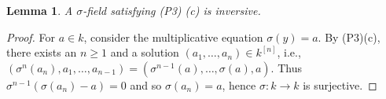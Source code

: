 \documentclass[oneside,reqno]{amsart}
\newtheorem{lemma}[theo]{Lemma}
\newtheorem{conj}[theo]{Conjecture}
\theoremstyle{definition}
\newcommand{\spec}{\operatorname{Spec}}
\newcommand{\G}{\mathcal{G}}
\newcommand{\X}{\mathcal{X}}
\newcommand{\s}{\sigma}
\newcommand{\Gm}{\mathbb{G}_m}
\newcommand{\kn}{k^{[n]}}
\newcommand{\po}{{\rm{(P1$^u$)}}}
\newcommand{\pt}{{\rm{(P3$^u$)}}}
\newcommand{\ptweak}{{\rm{(P3)}}}
\begin{document}
\begin{lemma} \label{lemma: inversive}
	A $\s$-field satisfying \ptweak{} \rm{(c)} is inversive. 
\end{lemma}
\begin{proof}
	For $a\in k$, consider the multiplicative equation $\s(y)=a$. By \ptweak{}(c), there exists an $n\geq 1$ and a solution $(a_1,\dots,a_n)\in\kn$, i.e., $(\s^n(a_n), a_1,\dots,a_{n-1})=(\s^{n-1}(a),\dots,\s(a),a)$. Thus $\s^{n-1}(\s(a_n)-a)=0$ and so $\s(a_n)=a$, hence $\s\colon k \to k$ is surjective. 
\end{proof}







%





\end{document}
